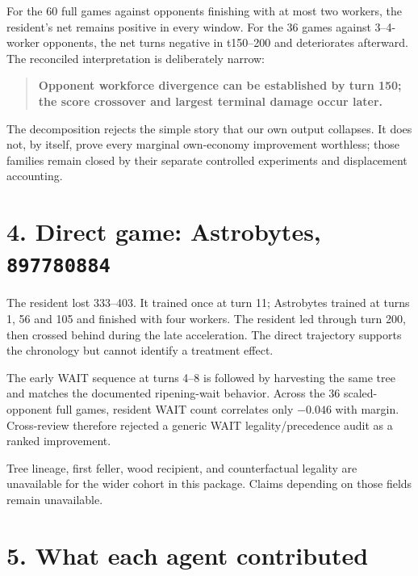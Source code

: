 \documentclass[10pt,a4paper]{article}
\begin{document}
For the 60 full games against opponents finishing with at most two workers, the resident's
net remains positive in every window. For the 36 games against 3--4-worker opponents, the
net turns negative in t150--200 and deteriorates afterward. The reconciled interpretation
is deliberately narrow:

\begin{quote}\raggedright
\textbf{Opponent workforce divergence can be established by turn 150; the score crossover
and largest terminal damage occur later.}
\end{quote}

The decomposition rejects the simple story that our own output collapses. It does not, by
itself, prove every marginal own-economy improvement worthless; those families remain
closed by their separate controlled experiments and displacement accounting.

\section*{4. Direct game: Astrobytes, \texttt{897780884}}

The resident lost 333--403. It trained once at turn 11; Astrobytes trained at turns 1, 56
and 105 and finished with four workers. The resident led through turn 200, then crossed
behind during the late acceleration. The direct trajectory supports the chronology but
cannot identify a treatment effect.

The early WAIT sequence at turns 4--8 is followed by harvesting the same tree and matches
the documented ripening-wait behavior. Across the 36 scaled-opponent full games, resident
WAIT count correlates only $-0.046$ with margin. Cross-review therefore rejected a generic
WAIT legality/precedence audit as a ranked improvement.

Tree lineage, first feller, wood recipient, and counterfactual legality are unavailable for
the wider cohort in this package. Claims depending on those fields remain unavailable.

\section*{5. What each agent contributed}
\end{document}
